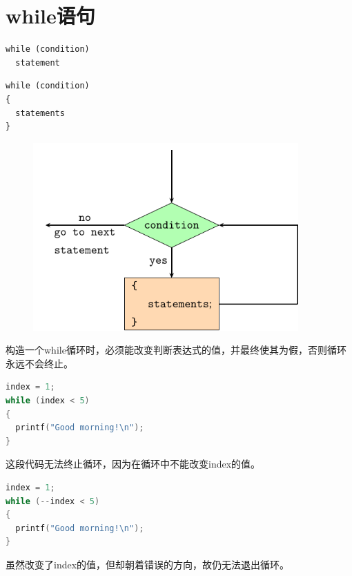 \section{while语句}

\begin{frame}[fragile]\ft{\secname}
\begin{lstlisting}
while (condition)
  statement
\end{lstlisting}
\begin{lstlisting}
while (condition)
{
  statements
}
\end{lstlisting}
\end{frame}

\begin{frame}[fragile]\ft{\secname}
\begin{figure}
\centering
\includegraphics[width=4in]{ch06/images/while.pdf}
\end{figure}

\end{frame}

\begin{frame}[fragile]
构造一个while循环时，必须能改变判断表达式的值，并最终使其为假，否则循环永远不会终止。
\pause \vspace{.1in}

\begin{lstlisting}[language=c]
index = 1;
while (index < 5)
{
  printf("Good morning!\n");
}
\end{lstlisting} 
\pause \vspace{0.1in}

这段代码无法终止循环，因为在循环中不能改变index的值。
\end{frame}

\begin{frame}[fragile]
\begin{lstlisting}[language=c]
index = 1;
while (--index < 5)
{
  printf("Good morning!\n");
}
\end{lstlisting} 
\pause \vspace{0.1in}

虽然改变了index的值，但却朝着错误的方向，故仍无法退出循环。
\end{frame}

